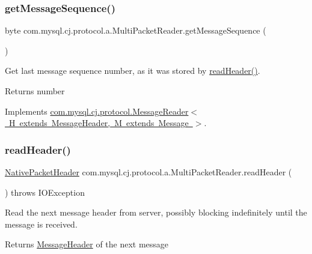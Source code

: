 \subsubsection{\texorpdfstring{get\+Message\+Sequence()}{getMessageSequence()}}
{\footnotesize\ttfamily byte com.\+mysql.\+cj.\+protocol.\+a.\+Multi\+Packet\+Reader.\+get\+Message\+Sequence (\begin{DoxyParamCaption}{ }\end{DoxyParamCaption})}

Get last message sequence number, as it was stored by \mbox{\hyperlink{classcom_1_1mysql_1_1cj_1_1protocol_1_1a_1_1_multi_packet_reader_a6a0250ba430aacfb45f8e1c0a7907465}{read\+Header()}}.

\begin{DoxyReturn}{Returns}
number 
\end{DoxyReturn}


Implements \mbox{\hyperlink{interfacecom_1_1mysql_1_1cj_1_1protocol_1_1_message_reader_ac4a36fb287c5308dd3d7e6157ef4e237}{com.\+mysql.\+cj.\+protocol.\+Message\+Reader$<$ H extends Message\+Header, M extends Message $>$}}.

\mbox{\label{classcom_1_1mysql_1_1cj_1_1protocol_1_1a_1_1_multi_packet_reader_a6a0250ba430aacfb45f8e1c0a7907465}} 
\subsubsection{\texorpdfstring{read\+Header()}{readHeader()}}
{\footnotesize\ttfamily \mbox{\hyperlink{classcom_1_1mysql_1_1cj_1_1protocol_1_1a_1_1_native_packet_header}{Native\+Packet\+Header}} com.\+mysql.\+cj.\+protocol.\+a.\+Multi\+Packet\+Reader.\+read\+Header (\begin{DoxyParamCaption}{ }\end{DoxyParamCaption}) throws I\+O\+Exception}

Read the next message header from server, possibly blocking indefinitely until the message is received.

\begin{DoxyReturn}{Returns}
\mbox{\hyperlink{interfacecom_1_1mysql_1_1cj_1_1protocol_1_1_message_header}{Message\+Header}} of the next message 
\end{DoxyReturn}


